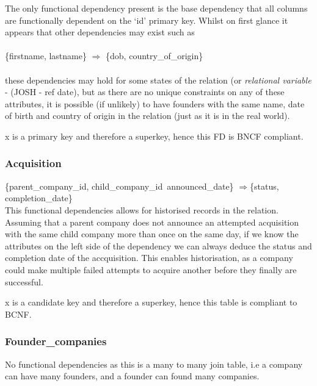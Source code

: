\documentclass[12pt]{article}
\begin{document}
The only functional dependency present is the base dependency that all columns are functionally dependent on the `id' primary key. Whilst on first glance it appears that other dependencies may exist such as \\\\
\{{firstname, lastname\}} $\Rightarrow$ \{{dob, country\_of\_origin\}}\\\\
these dependencies may hold for some states of the relation (or \emph{relational variable} - (JOSH - ref date), but as there are no unique constraints on any of these attributes, it is possible (if unlikely) to have founders with the same name, date of birth and country of origin in the relation (just as it is in the real world).

x is a primary key and therefore a superkey, hence this FD is BNCF compliant.

\subsubsection{Acquisition}
\{{parent\_company\_id, child\_company\_id\, announced\_date}\} $\Rightarrow${\{status, completion\_date}\} \\

This functional dependencies allows for historised records in the relation. Assuming that a parent company does not announce an attempted acquisition with the same child company more than once on the same day, if we know the attributes on the left side of the dependency we can always deduce the status and completion date of the accquisition. This enables historisation, as a company could make multiple failed attempts to acquire another before they finally are successful.

x is a candidate key and therefore a superkey, hence this table is compliant to BCNF.

\subsubsection{Founder\_companies}
No functional dependencies as this is a many to many join table, i.e a company can have many founders, and a founder can found many companies.
\end{document}
